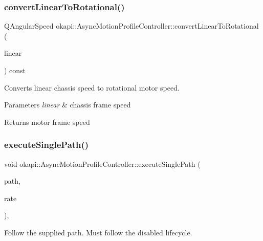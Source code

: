 \subsubsection{\texorpdfstring{convertLinearToRotational()}{convertLinearToRotational()}}
{\footnotesize\ttfamily Q\+Angular\+Speed okapi\+::\+Async\+Motion\+Profile\+Controller\+::convert\+Linear\+To\+Rotational (\begin{DoxyParamCaption}\item[{Q\+Speed}]{linear }\end{DoxyParamCaption}) const\hspace{0.3cm}{\ttfamily [protected]}}

Converts linear chassis speed to rotational motor speed.


\begin{DoxyParams}{Parameters}
{\em linear} & chassis frame speed \\
\hline
\end{DoxyParams}
\begin{DoxyReturn}{Returns}
motor frame speed 
\end{DoxyReturn}
\mbox{\label{classokapi_1_1AsyncMotionProfileController_abbc724e5856bff8879cb834bfc3cc6c3}} 
\subsubsection{\texorpdfstring{executeSinglePath()}{executeSinglePath()}}
{\footnotesize\ttfamily void okapi\+::\+Async\+Motion\+Profile\+Controller\+::execute\+Single\+Path (\begin{DoxyParamCaption}\item[{const \mbox{\hyperlink{structokapi_1_1AsyncMotionProfileController_1_1TrajectoryPair}{Trajectory\+Pair}} \&}]{path,  }\item[{std\+::unique\+\_\+ptr$<$ \mbox{\hyperlink{classokapi_1_1AbstractRate}{Abstract\+Rate}} $>$}]{rate }\end{DoxyParamCaption})\hspace{0.3cm}{\ttfamily [protected]}, {\ttfamily [virtual]}}

Follow the supplied path. Must follow the disabled lifecycle. \mbox{\label{classokapi_1_1AsyncMotionProfileController_a7069b2b7373aec21c84369392d8d34d8}} 

